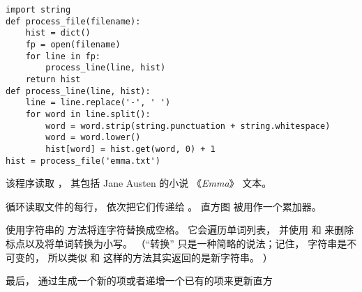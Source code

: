 
\begin{lstlisting}
import string
def process_file(filename):
    hist = dict()
    fp = open(filename)
    for line in fp:
        process_line(line, hist)
    return hist
def process_line(line, hist):
    line = line.replace('-', ' ')
    for word in line.split():
        word = word.strip(string.punctuation + string.whitespace)
        word = word.lower()
        hist[word] = hist.get(word, 0) + 1
hist = process_file('emma.txt')
\end{lstlisting}


该程序读取  ， 其包括 Jane Austen 的小说 《{\em Emma}》 文本。  



 循环读取文件的每行， 依次把它们传递给  。  
直方图  被用作一个累加器。  



 使用字符串的  方法将连字符替换成空格。  
它会遍历单词列表， 并使用  和  来删除标点以及将单词转换为小写。  
（``转换'' 只是一种简略的说法；记住， 字符串是不可变的， 所以类似  和  这样的方法其实返回的是新字符串。  ）


最后，  通过生成一个新的项或者递增一个已有的项来更新直方


